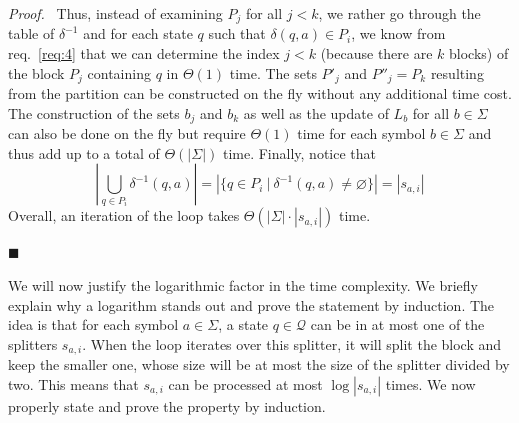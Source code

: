 \documentclass[12pt, a4 paper]{article}
\renewenvironment{proof}[1][Proof]{\begin{mdframed}[backgroundcolor=black!5, topline=false, rightline=false, bottomline=false, linecolor=black!15, linewidth=3pt]{\noindent\textit{#1.}\ }}{\noindent\par\hfill$\blacksquare$\end{mdframed}}
\theoremstyle{definition}
\begin{document}
\begin{proof}
    Thus, instead of examining $P_j$ for all $j < k$, we rather go through the table of $\delta^{-1}$ and for each state $q$ such that $\delta(q, a) \in P_i$, we know from req.\ \ref{req:4} that we can determine the index $j < k$ (because there are $k$ blocks) of the block $P_j$ containing $q$ in $\Theta(1)$ time. The sets $P'_j$ and $P''_j = P_k$ resulting from the partition can be constructed on the fly without any additional time cost. The construction of the sets $b_j$ and $b_k$ as well as the update of $L_b$ for all $b \in \Sigma$ can also be done on the fly but require $\Theta(1)$ time for each symbol $b \in \Sigma$ and thus add up to a total of $\Theta(\left| \Sigma \right|)$ time.
    Finally, notice that $$ \left| \bigcup_{q \in P_i} \delta^{-1}(q, a) \right| = \left| \{ q \in P_i \ | \ \delta^{-1}(q,a) \neq \varnothing \} \right| = \left| s_{a,i} \right| $$
    Overall, an iteration of the loop takes $\Theta\left(\left| \Sigma \right| \cdot \left| s_{a,i} \right| \right)$ time.
\end{proof}

We will now justify the logarithmic factor in the time complexity. We briefly explain why a logarithm stands out and prove the statement by induction. The idea is that for each symbol $a \in \Sigma$, a state $q \in \mathcal{Q}$ can be in at most one of the splitters $s_{a,i}$. When the loop iterates over this splitter, it will split the block and keep the smaller one, whose size will be at most the size of the splitter divided by two. This means that $s_{a, i}$ can be processed at most $\log \left| s_{a,i} \right|$ times. We now properly state and prove the property by induction.
\end{document}
